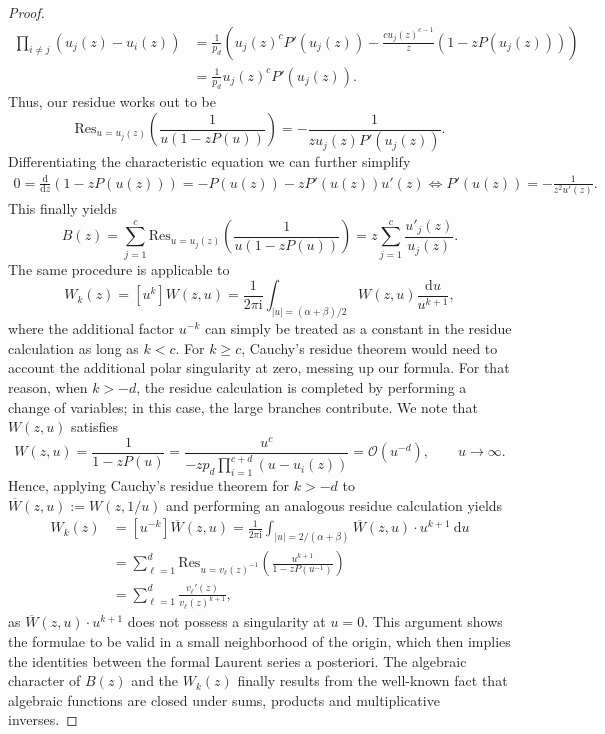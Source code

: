 \begin{proof}
\begin{align*}
    \prod_{i\neq j}(u_j(z) - u_i(z)) 
    &= \frac{1}{p_d}\left(u_j(z)^cP'(u_j(z)) -\frac{cu_j(z)^{c-1}}{z}\left(1 - zP(u_j(z))\right)\right) \\
    &= \frac{1}{p_d}u_j(z)^cP'(u_j(z)).
  \end{align*}
  Thus, our residue works out to be 
  $$
    \mathrm{Res}_{u = u_j(z)}\left(\frac{1}{u(1-zP(u))}\right) = -\frac{1}{zu_j(z)P'(u_j(z))}.
  $$
  Differentiating the characteristic equation we can further simplify
  \begin{align*}
      0 = \frac{\mathrm{d}}{\mathrm{d}z}(1 - zP(u(z))) = -P(u(z)) - zP'(u(z))u'(z)
      \iff P'(u(z)) = - \frac{1}{z^2u'(z)}.
  \end{align*}
  This finally yields 
  $$
    B(z) = \sum_{j = 1}^c \mathrm{Res}_{u = u_j(z)}\left(\frac{1}{u(1-zP(u))}\right) 
    = z\sum_{j=1}^{c}\frac{u'_j(z)}{u_j(z)}.
  $$
  The same procedure is applicable to 
  $$
    W_k(z) = [u^k]W(z,u) = \frac{1}{2\pi \mathrm{i}}\int_{|u| = (\alpha + \beta)/2} W(z,u) \frac{\mathrm{d}u}{u^{k+1}},
  $$
  where the additional factor $u^{-k}$ can simply be treated as a constant in the residue calculation as long as $k < c$. For $k \geq c$, Cauchy's residue theorem would need to account the additional polar singularity at zero, messing up our formula. 
  For that reason, when $k > -d$, the residue calculation is completed by performing a change of variables; in this case, the large branches contribute. 
  We note that $W(z,u)$ satisfies
  $$
  W(z,u) = \frac{1}{1 - zP(u)} = \frac{u^c}{-zp_d \prod_{i=1}^{c+d}(u - u_i(z))} = \mathcal{O}(u^{-d}), \qquad u \to \infty.
  $$
  Hence, applying Cauchy's residue theorem for $k > -d$ to $\overline{W}(z,u) := W(z,1/u)$ and performing an analogous residue calculation yields
  \begin{align*}
    W_k(z) &= [u^{-k}]\overline{W}\left(z,u\right)
    = \frac{1}{2\pi \mathrm{i}} \int_{|u| = 2/(\alpha + \beta)} \overline{W}\left(z,u\right) \cdot u^{k+1}~\mathrm{d}u \\
    &= \sum_{\ell = 1}^d \mathrm{Res}_{u = v_\ell(z)^{-1}}
    \left(
      \frac{u^{k+1}}{1-zP(u^{-1})}
    \right) \\
    &= \sum_{\ell = 1}^d \frac{v_\ell'(z)}{v_\ell(z)^{k+1}},
  \end{align*}
  as $\overline{W}\left(z,u\right) \cdot u^{k+1}$ does not possess a singularity at $u = 0$.
  This argument shows the formulae to be valid in a small neighborhood of the origin, which then implies the identities between the formal Laurent series a posteriori.
  The algebraic character of $B(z)$ and the $W_k(z)$ finally results from the well-known fact that algebraic functions are closed under sums, products and multiplicative inverses.
\end{proof}

